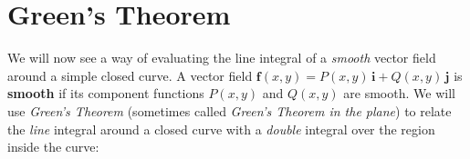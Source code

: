 \section{Green's Theorem}
We will now see a way of evaluating the line integral of a \emph{smooth} vector field
around a simple closed curve. 
A vector field $\textbf{f}(x,y) = P(x,y)\,\textbf{i} + Q(x,y)\,\textbf{j}$ is \textbf{smooth} if its
component functions $P(x,y)$ and $Q(x,y)$ are smooth.
We will use
\emph{Green's Theorem} (sometimes called \emph{Green's Theorem in the plane}) to relate the \emph{line} integral around
a closed curve with a \emph{double} integral over the region inside the curve:

